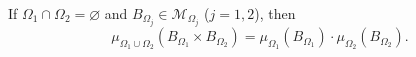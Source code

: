 If $\Omega_1 \cap \Omega_2 = \varnothing$ and $B_{\Omega_j} \in \mathcal{M}_{\Omega_j}$ ($j=1,2$), then
$$\mu_{\Omega_1 \cup \Omega_2}(B_{\Omega_1} \times B_{\Omega_2}) = \mu_{\Omega_1}(B_{\Omega_1}) \cdot \mu_{\Omega_2}(B_{\Omega_2}).$$
